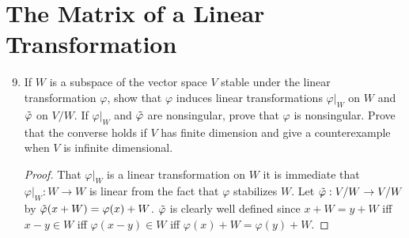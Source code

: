 \documentclass{report}
\begin{document}
\section{The Matrix of a Linear Transformation}
\begin{enumerate} 
	\setcounter{enumi}{8}
	\item If $W$ is a subspace of the vector space $V$ stable under the linear transformation $\varphi$, show that $\varphi$ induces linear transformations
		$\varphi|_W$ on $W$ and $\Tilde{\varphi}$ on $V / W$. If $\varphi|_W$ and $\Tilde{\varphi}$ are nonsingular, prove that $\varphi$ is nonsingular.
		Prove that the converse holds if $V$ has finite dimension and give a counterexample when $V$ is infinite dimensional.
		\begin{proof}
			That $\varphi|_W$ is a linear transformation on $W$ it is immediate that $\varphi|_W:W\to W$ is linear from the fact that $\varphi$ stabilizes $W$.
			Let $\Tilde{\varphi}:V /W\to V /W$ by $\Tilde{\varphi}(x+W)=\varphi(x)+W$. $\Tilde{\varphi}$ is clearly well defined since 
			$x+W=y+W$ iff $x-y\in W$ iff $\varphi(x-y)\in W$ iff $\varphi(x)+W=\varphi(y)+W$.
			\newline


\end{proof}
\end{enumerate}
\end{document}
